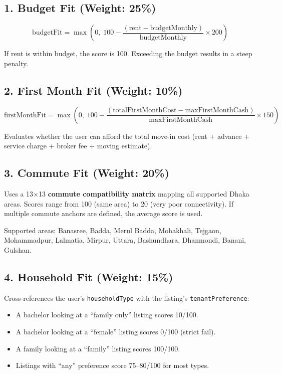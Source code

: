 \documentclass[12pt, a4paper, oneside]{report}
\begin{document}
\subsection{1. Budget Fit (Weight: 25\%)}

\begin{equation}
\text{budgetFit} = \max\!\left(0,\; 100 - \frac{(\text{rent} - \text{budgetMonthly})}{\text{budgetMonthly}} \times 200\right)
\end{equation}

If rent is within budget, the score is 100. Exceeding the budget results in a steep penalty.

\subsection{2. First Month Fit (Weight: 10\%)}

\begin{equation}
\text{firstMonthFit} = \max\!\left(0,\; 100 - \frac{(\text{totalFirstMonthCost} - \text{maxFirstMonthCash})}{\text{maxFirstMonthCash}} \times 150\right)
\end{equation}

Evaluates whether the user can afford the total move-in cost (rent + advance + service charge + broker fee + moving estimate).

\subsection{3. Commute Fit (Weight: 20\%)}

Uses a 13$\times$13 \textbf{commute compatibility matrix} mapping all supported Dhaka areas. Scores range from 100 (same area) to 20 (very poor connectivity). If multiple commute anchors are defined, the average score is used.

Supported areas: Banasree, Badda, Merul Badda, Mohakhali, Tejgaon, Mohammadpur, Lalmatia, Mirpur, Uttara, Bashundhara, Dhanmondi, Banani, Gulshan.

\subsection{4. Household Fit (Weight: 15\%)}

Cross-references the user's \texttt{householdType} with the listing's \texttt{tenantPreference}:

\begin{itemize}[leftmargin=2em]
  \item A bachelor looking at a ``family only'' listing scores 10/100.
  \item A bachelor looking at a ``female'' listing scores 0/100 (strict fail).
  \item A family looking at a ``family'' listing scores 100/100.
  \item Listings with ``any'' preference score 75--80/100 for most types.
\end{itemize}
\end{document}
